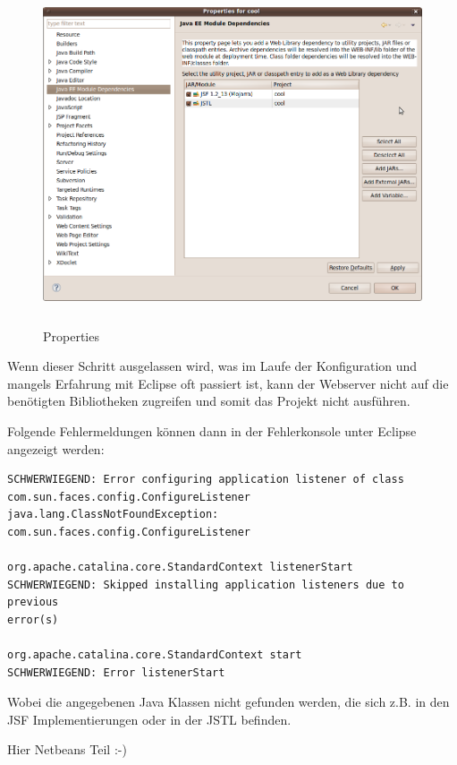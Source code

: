 \documentclass[titlepage, 12pt,a4paper]{scrartcl}
\begin{document}
\begin{figure}[h]
\begin{center}
\includegraphics[width=15cm, height=10cm]{bilder/Properties.png}
\caption{Properties}
\label{properties}
\end{center}
\end{figure}

Wenn dieser Schritt ausgelassen wird, was im Laufe der Konfiguration
und mangels Erfahrung mit Eclipse oft passiert ist, kann der Webserver nicht
auf die benötigten Bibliotheken zugreifen und somit das Projekt nicht
ausführen. 

Folgende Fehlermeldungen können dann in der Fehlerkonsole unter Eclipse
angezeigt werden:


\begin{verbatim}
SCHWERWIEGEND: Error configuring application listener of class
com.sun.faces.config.ConfigureListener
java.lang.ClassNotFoundException: com.sun.faces.config.ConfigureListener

org.apache.catalina.core.StandardContext listenerStart
SCHWERWIEGEND: Skipped installing application listeners due to previous
error(s)

org.apache.catalina.core.StandardContext start
SCHWERWIEGEND: Error listenerStart

\end{verbatim}

Wobei die angegebenen Java Klassen nicht gefunden werden, die sich z.B. in den
JSF Implementierungen oder in der JSTL befinden. 




Hier Netbeans Teil :-)
\end{document}
